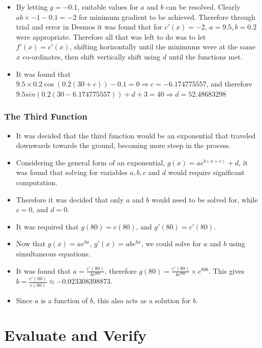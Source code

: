 \documentclass[11pt, letterpaper]{article}
\begin{document}
\begin{itemize}
	\item By letting $g=-0.1$, suitable values for $a$ and $b$ can be resolved. Clearly $ab\times-1-0.1=-2$ for minimum gradient to be achieved. Therefore through trial and error in Desmos it was found that for $c'(x)=-2$, $a=9.5,b=0.2$ were appropriate. Therefore all that was left to do was to let $f'(x)=c'(x)$, shifting horizontally until the minimums were at the same $x$ co-ordinates, then shift vertically shift using $d$ until the functions met.  
	\item It was found  that $9.5\times0.2\cos (0.2(30+c))-0.1=0 \Rightarrow c=-6.174775557$, and therefore $9.5sin(0.2(30-6.174775557))+d+3=40 \Rightarrow d=52.48683298$
\end{itemize}
\subsubsection{The Third Function}
\begin{itemize}
	\item It was decided that the third function would be an exponential that traveled downwards towards the ground, becoming more steep in the process. 
	\item Considering the general form of an exponential, $g(x)=ae^{b(x+c)}+d$, it was found that solving for variables $a, b, c$ and $d$ would require significant computation.
	\item Therefore it was decided that only $a$ and $b$ would need to be solved for, while $c=0$, and $d=0$.
	\item It was required that $g(80)=c(80)$, and $g'(80)=c'(80)$.
	\item Now that $g(x)=ae^{bx}$, $g'(x)=abe^{bx}$, we could solve for $a$ and $b$ using simultaneous equations.
	\item It was found that $a=\frac{c'(80)}{be^{80b}}$, therefore $g(80)=\frac{c'(80)}{be^{80b}}\times e^{80b}$. This gives $b=\frac{c'(80)}{c(80)}\approx -0.023308398873$.
	\item Since $a$ is a function of $b$, this also acts as a solution for $b$.
\end{itemize}






\section{Evaluate and Verify}
\end{document}
